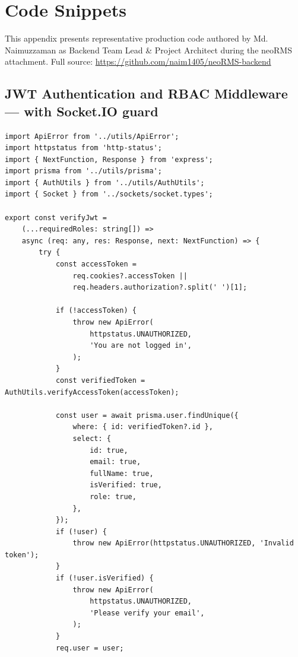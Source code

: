 \chapter{Code Snippets}
\label{app:code}

This appendix presents representative production code authored by Md. Naimuzzaman as Backend Team Lead \& Project Architect during the neoRMS attachment. Full source: \url{https://github.com/naim1405/neoRMS-backend}

\section{JWT Authentication and RBAC Middleware --- with Socket.IO guard}
\label{app:auth_middleware}

\begin{lstlisting}[caption={JWT Authentication + RBAC + Socket.IO auth guard --- \texttt{src/middlewares/auth.middleware.ts} --- Author: Naim --- 24 Feb 2026},label=lst:auth]
import ApiError from '../utils/ApiError';
import httpstatus from 'http-status';
import { NextFunction, Response } from 'express';
import prisma from '../utils/prisma';
import { AuthUtils } from '../utils/AuthUtils';
import { Socket } from '../sockets/socket.types';

export const verifyJwt =
    (...requiredRoles: string[]) =>
    async (req: any, res: Response, next: NextFunction) => {
        try {
            const accessToken =
                req.cookies?.accessToken ||
                req.headers.authorization?.split(' ')[1];

            if (!accessToken) {
                throw new ApiError(
                    httpstatus.UNAUTHORIZED,
                    'You are not logged in',
                );
            }
            const verifiedToken = AuthUtils.verifyAccessToken(accessToken);

            const user = await prisma.user.findUnique({
                where: { id: verifiedToken?.id },
                select: {
                    id: true,
                    email: true,
                    fullName: true,
                    isVerified: true,
                    role: true,
                },
            });
            if (!user) {
                throw new ApiError(httpstatus.UNAUTHORIZED, 'Invalid token');
            }
            if (!user.isVerified) {
                throw new ApiError(
                    httpstatus.UNAUTHORIZED,
                    'Please verify your email',
                );
            }
            req.user = user;


\end{lstlisting}
